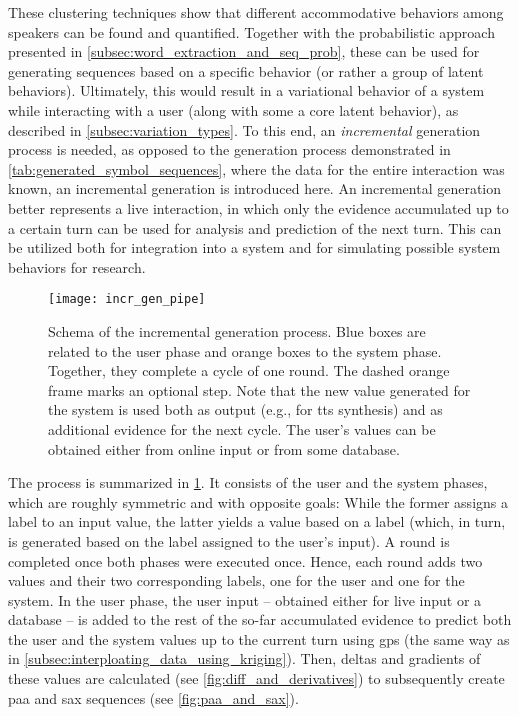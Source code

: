 These clustering techniques show that different accommodative behaviors among speakers can be found and quantified.
Together with the probabilistic approach presented in \cref{subsec:word_extraction_and_seq_prob}, these can be used for generating sequences based on a specific behavior (or rather a group of latent behaviors).
Ultimately, this would result in a variational behavior of a system while interacting with a user (along with some a core latent behavior), as described in \cref{subsec:variation_types}.
To this end, an \emph{incremental} generation process is needed, as opposed to the generation process demonstrated in \cref{tab:generated_symbol_sequences}, where the data for the entire interaction was known, an incremental generation is introduced here.
An incremental generation better represents a live interaction, in which only the evidence accumulated up to a certain turn can be used for analysis and prediction of the next turn.
This can be utilized both for integration into a system and for simulating possible system behaviors for research.
%
\begin{figure}[t]
	\centering
	\texttt{[image: incr\_gen\_pipe]}
	\caption[Incremental generation process]
		{Schema of the incremental generation process.
		 Blue boxes are related to the user phase and orange boxes to the system phase.
		 Together, they complete a cycle of one round.
		 The dashed orange frame marks an optional step.
		 Note that the new value generated for the system is used both as output (e.g., for \ac{tts} synthesis) and as additional evidence for the next cycle.
		 The user's values can be obtained either from online input or from some database.}
	\label{fig:incr_gen_pipe}
\end{figure}
%
The process is summarized in \cref{fig:incr_gen_pipe}.
It consists of the user and the system phases, which are roughly symmetric and with opposite goals:
While the former assigns a label to an input value, the latter yields a value based on a label (which, in turn, is generated based on the label assigned to the user's input).
A round is completed once both phases were executed once.
Hence, each round adds two values and their two corresponding labels, one for the user and one for the system.
In the user phase, the user input -- obtained either for live input or a database -- is added to the rest of the so-far accumulated evidence to predict both the user and the system values up to the current turn using \acp{gp} (the same way as in \cref{subsec:interploating_data_using_kriging}).
Then, deltas and gradients of these values are calculated (see \cref{fig:diff_and_derivatives}) to subsequently create \ac{paa} and \ac{sax} sequences (see \cref{fig:paa_and_sax}).
